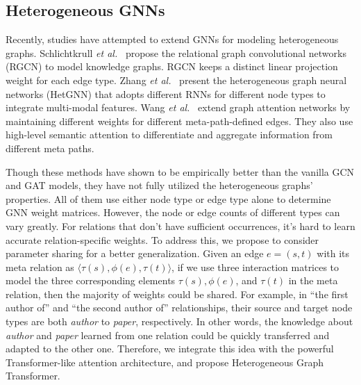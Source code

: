 \documentclass[sigconf]{acmart}
\theoremstyle{definition}
\newcommand{\model}{Heterogeneous Graph Transformer}
\begin{document}
\subsection{Heterogeneous GNNs}
Recently, studies have attempted to extend GNNs for modeling heterogeneous graphs. 
Schlichtkrull \textit{et al.}~\cite{DBLP:conf/esws/SchlichtkrullKB18} propose the relational graph convolutional networks (RGCN) to model knowledge graphs. 
RGCN keeps a distinct linear projection weight for each edge type. 
Zhang \textit{et al.}~\cite{DBLP:conf/kdd/ZhangSHSC19} present the heterogeneous graph neural networks (HetGNN) that adopts different RNNs for different node types to integrate multi-modal features. 
Wang \textit{et al.}~\cite{DBLP:conf/www/WangJSWYCY19} extend graph attention networks by maintaining different weights for different meta-path-defined edges. They also use high-level semantic attention to differentiate and aggregate information from different meta paths.

Though these methods have shown to be empirically better than the vanilla GCN and GAT models, they have not fully utilized the heterogeneous graphs' properties. All of them use either node type or edge type alone to determine GNN weight matrices. 
However, the node or edge counts of different types can vary greatly. 
For relations that don't have sufficient occurrences, it's hard to learn accurate relation-specific weights. To address this, we propose to consider parameter sharing for a better generalization. 
Given an edge $e=(s,t)$  with its meta relation as $\langle \tau(s), \phi(e), \tau(t) \rangle$, if we use three interaction matrices to model the three corresponding elements $\tau(s), \phi(e)$, and $\tau(t)$ in the meta relation, then the majority of weights could be shared. 
For example, in ``the first author of'' and ``the second author of'' relationships, their source and target node types are both \textit{author} to \textit{paper}, respectively. 
In other words, the knowledge about \textit{author} and \textit{paper} learned from one relation could be quickly transferred and adapted to the other one. 
Therefore, we integrate this idea with the powerful Transformer-like attention architecture, and propose \model. 
\end{document}
